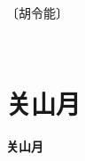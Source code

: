 \documentclass[12pt,UTF-8,openany,fontset=none]{ctexbook}
\begin{document}
\begin{center}
    \vspace{10pt}
    
    \begin{large}
        
        〔胡令能〕
        
    \end{large}
    
    \vspace{8pt}
    
    \begin{huge}
        
        \phantom{。}

        \phantom{。}
        
        \phantom{。}

        \phantom{。}~~
        
    \end{huge}
    
\end{center}

\vspace{8pt}
\clearpage


\section{关山月}



\begin{center}
    {\bfseries 关山月}
\end{center}
\end{document}
